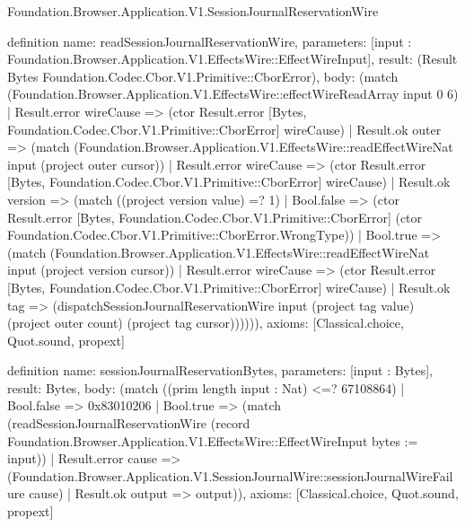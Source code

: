 \begin{lexlean}{Foundation.Browser.Application.V1.SessionJournalReservationWire}
\begin{semanticmodule}
definition{
  name: readSessionJournalReservationWire,
  parameters: [input : Foundation.Browser.Application.V1.EffectsWire::EffectWireInput],
  result: (Result Bytes Foundation.Codec.Cbor.V1.Primitive::CborError),
  body: (match (Foundation.Browser.Application.V1.EffectsWire::effectWireReadArray input 0 6)
    | Result.error wireCause => (ctor Result.error [Bytes, Foundation.Codec.Cbor.V1.Primitive::CborError] wireCause)
    | Result.ok outer => (match (Foundation.Browser.Application.V1.EffectsWire::readEffectWireNat input (project outer cursor))
      | Result.error wireCause => (ctor Result.error [Bytes, Foundation.Codec.Cbor.V1.Primitive::CborError] wireCause)
      | Result.ok version => (match ((project version value) =? 1)
        | Bool.false => (ctor Result.error [Bytes, Foundation.Codec.Cbor.V1.Primitive::CborError] (ctor Foundation.Codec.Cbor.V1.Primitive::CborError.WrongType))
        | Bool.true => (match (Foundation.Browser.Application.V1.EffectsWire::readEffectWireNat input (project version cursor))
          | Result.error wireCause => (ctor Result.error [Bytes, Foundation.Codec.Cbor.V1.Primitive::CborError] wireCause)
          | Result.ok tag => (dispatchSessionJournalReservationWire input (project tag value) (project outer count) (project tag cursor)))))),
  axioms: [Classical.choice, Quot.sound, propext]
}

definition{
  name: sessionJournalReservationBytes,
  parameters: [input : Bytes],
  result: Bytes,
  body: (match ((prim length input : Nat) <=? 67108864)
    | Bool.false => 0x83010206
    | Bool.true => (match (readSessionJournalReservationWire (record Foundation.Browser.Application.V1.EffectsWire::EffectWireInput {bytes := input}))
      | Result.error cause => (Foundation.Browser.Application.V1.SessionJournalWire::sessionJournalWireFailure cause)
      | Result.ok output => output)),
  axioms: [Classical.choice, Quot.sound, propext]
}
\end{semanticmodule}
\end{lexlean}
